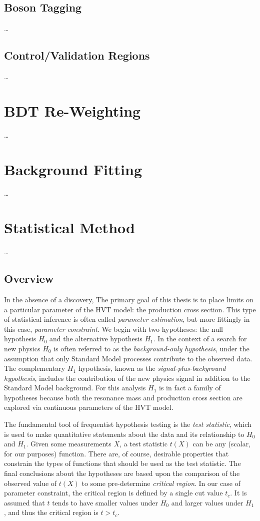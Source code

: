 \subsection{Boson Tagging}
\dots
\subsection{Control/Validation Regions}
\dots

\section{BDT Re-Weighting}
\dots

\section{Background Fitting}
\dots

\section{Statistical Method}
\dots

\subsection{Overview}
In the absence of a discovery, The primary goal of this thesis is to place limits on a particular parameter of the HVT model: the production cross section.
This type of statistical inference is often called \textit{parameter estimation}, but more fittingly in this case, \textit{parameter constraint}. 
We begin with two hypotheses: the null hypothesis $H_0$ and the alternative hypothesis $H_1$.
In the context of a search for new physics $H_0$ is often referred to as the \textit{background-only hypothesis}, under the assumption that only Standard Model processes contribute to the observed data.
The complementary $H_1$ hypothesis, known as the \textit{signal-plus-background hypothesis}, includes the contribution of the new physics signal in addition to the Standard Model background.
For this analysis $H_1$ is in fact a family of hypotheses because both the resonance mass and production cross section are explored via continuous parameters of the HVT model.

The fundamental tool of frequentist hypothesis testing is the \textit{test statistic}, which is used to make quantitative statements about the data and its relationship to $H_0$ and $H_1$.
Given some measurements $X$, a test statistic $t(X)$ can be any (scalar, for our purposes) function.
There are, of course, desirable properties that constrain the types of functions that should be used as the test statistic.
The final conclusions about the hypotheses are based upon the comparison of the observed value of $t(X)$ to some pre-determine \textit{critical region}.
In our case of parameter constraint, the critical region is defined by a single cut value $t_c$.
It is assumed that $t$ tends to have smaller values under $H_0$ and larger values under $H_1$, and thus the critical region is $t > t_c$.

